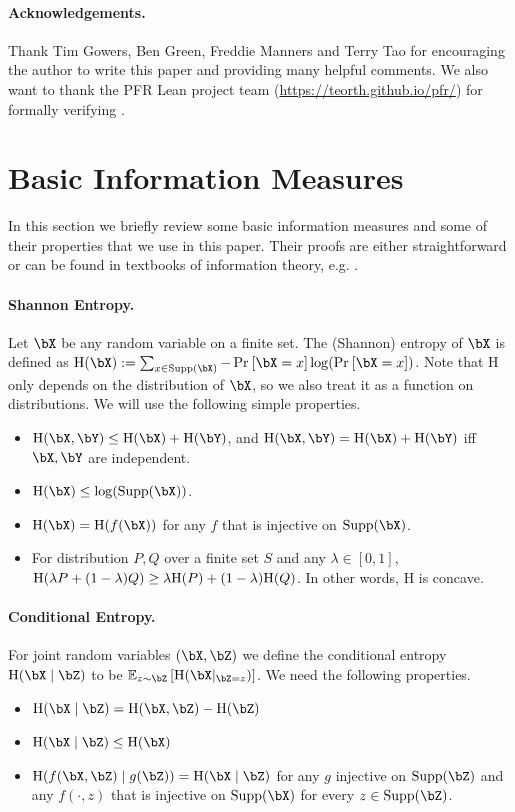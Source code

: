 \documentclass{article}
\DeclarePairedDelimiter{\paren}{(}{)}
\newcommand{\ent}{\mathrm{H}\paren}
\begin{document}
\paragraph{Acknowledgements.} Thank Tim Gowers, Ben Green, Freddie Manners and Terry Tao for encouraging the author to write this paper and providing many helpful comments. We also want to thank the PFR Lean project team (\url{https://teorth.github.io/pfr/}) for formally verifying .

\appendix
\section{Basic Information Measures}\label{appendix:definition}
In this section we briefly review some basic information measures and some of their properties that we use in this paper. Their proofs are either straightforward or can be found in textbooks of information theory, e.g. \cite{Cover}.

\paragraph{Shannon Entropy.} Let $\bX$ be any random variable on a finite set. The (Shannon) entropy of $\bX$ is defined as $\ent{\bX}:=\sum_{x\in \Supp(\bX)} -\pr{\bX=x}\log(\pr{\bX=x})$. Note that $\mathrm{H}$ only depends on the distribution of $\bX$, so we also treat it as a function on distributions. We will use the following simple properties.
\begin{itemize}
\item 
$\ent{\bX,\bY}\le \ent{\bX}+\ent{\bY}$, and $\ent{\bX,\bY}= \ent{\bX}+\ent{\bY}$ iff $\bX,\bY$ are independent.
\item
$\ent{\bX}\le\log(\Supp(\bX))$.
\item 
$\ent{\bX}=\ent{f(\bX)}$ for any $f$ that is injective on $\Supp(\bX)$.
\item
For distribution $P,Q$ over a finite set $S$ and any $\lambda\in[0,1]$, $\ent{\lambda P + (1-\lambda) Q}\ge \lambda \ent{P} + (1-\lambda) \ent{Q}$. In other words, $\mathrm{H}$ is concave.
\end{itemize}

\paragraph{Conditional Entropy.} For joint random variables $(\bX,\bZ)$ we define the conditional entropy $\ent{\bX\mid\bZ}$ to be $\ex[z\sim\bZ]{\ent{\bX|_{\bZ=z}}}$. We need the following properties.
\begin{itemize}
\item 
$\ent{\bX\mid\bZ}=\ent{\bX,\bZ}-\ent{\bZ}$
\item 
$\ent{\bX\mid\bZ}\le\ent{\bX}$
\item 
$\ent{f(\bX,\bZ)\mid g(\bZ)}=\ent{\bX\mid\bZ}$ for any $g$ injective on $\Supp(\bZ)$ and any $f(\cdot,z)$ that is injective on $\Supp(\bX)$ for every $z\in\Supp(\bZ)$. 
\end{itemize}
\end{document}
